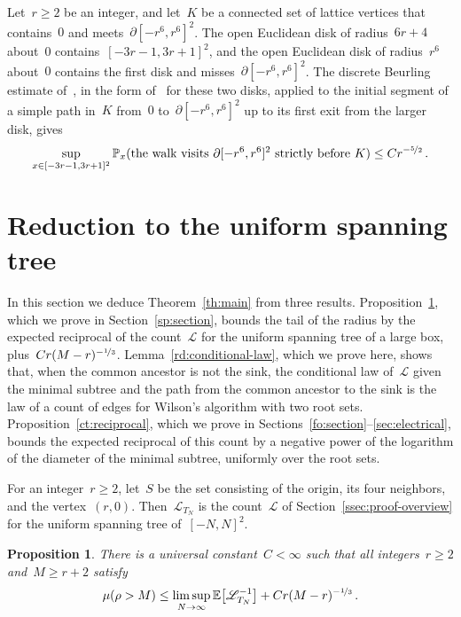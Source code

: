 \documentclass[11pt]{amsart}
\numberwithin{equation}{section}
\newtheorem{proposition}[equation]{Proposition}
\newcommand{\PP}{\mathbb P}
\newcommand{\EE}{\mathbb E}
\newcommand{\nf}{\nicefrac}
\newcommand{\cL}{\mathscr{L}}
\begin{document}
Let~$r\geq2$ be an integer, and let~$K$ be a connected set of lattice vertices that contains~$0$ and meets~$\partial[-r^6,r^6]^2$. The open Euclidean disk of radius~$6r+4$ about~$0$ contains~$[-3r-1,3r+1]^2$, and the open Euclidean disk of radius~$r^6$ about~$0$ contains the first disk and misses~$\partial[-r^6,r^6]^2$. The discrete Beurling estimate of~\citet{Kesten1987}, in the form of~\citet[Lemma~2.1]{Lawler2020} for these two disks, applied to the initial segment of a simple path in~$K$ from~$0$ to~$\partial[-r^6,r^6]^2$ up to its first exit from the larger disk, gives
\begin{equation}\label{ct:beurling}
\sup_{x\in [-3r-1,3r+1]^2}\PP_x(\text{the walk visits~$\partial[-r^6,r^6]^2$ strictly before~$K$})\leq Cr^{-\nf52}\,.
\end{equation}

\section{Reduction to the uniform spanning tree}\label{rd:section}

In this section we deduce Theorem~\ref{th:main} from three results. Proposition~\ref{sp:reciprocal-reduction}, which we prove in Section~\ref{sp:section}, bounds the tail of the radius by the expected reciprocal of the count~$\cL$ for the uniform spanning tree of a large box, plus~$Cr(M-r)^{-\nf13}$. Lemma~\ref{rd:conditional-law}, which we prove here, shows that, when the common ancestor is not the sink, the conditional law of~$\cL$ given the minimal subtree and the path from the common ancestor to the sink is the law of a count of edges for Wilson's algorithm with two root sets. Proposition~\ref{ct:reciprocal}, which we prove in Sections~\ref{fo:section}--\ref{sec:electrical}, bounds the expected reciprocal of this count by a negative power of the logarithm of the diameter of the minimal subtree, uniformly over the root sets.

For an integer~$r\geq2$, let~$S$ be the set consisting of the origin, its four neighbors, and the vertex~$(r,0)$. Then~$\cL_{T_N}$ is the count~$\cL$ of Section~\ref{ssec:proof-overview} for the uniform spanning tree of~$[-N,N]^2$.

\begin{proposition}\label{sp:reciprocal-reduction}
There is a universal constant~$C<\infty$ such that all integers~$r\geq2$ and~$M\geq r+2$ satisfy
\begin{equation}\label{sp:reduction-bound}
\mu(\rho>M)\leq\limsup_{N\to\infty}\EE\bigl[\cL_{T_N}^{-1}\bigr]+Cr(M-r)^{-\nf13}\,.
\end{equation}
\end{proposition}
\end{document}

